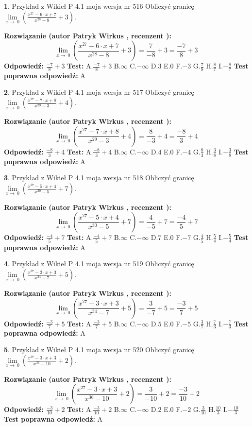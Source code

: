 \documentclass[12pt, a4paper]{article}
\theoremstyle{definition} %
\newtheorem{zad}{}
\newcommand{\zadStart}[1]{\begin{zad}#1\newline}
\newcommand{\zadStop}{\end{zad}}
\newcommand{\rozwStart}[2]{\noindent \textbf{Rozwiązanie (autor #1 , recenzent #2): }\newline}
\newcommand{\rozwStop}{\newline}
\newcommand{\odpStart}{\noindent \textbf{Odpowiedź:}\newline}
\newcommand{\odpStop}{\newline}
\newcommand{\testStart}{\noindent \textbf{Test:}\newline}
\newcommand{\testStop}{\newline}
\newcommand{\kluczStart}{\noindent \textbf{Test poprawna odpowiedź:}\newline}
\newcommand{\kluczStop}{\newline}
\begin{document}
\zadStart{Przykład z Wikieł P 4.1 moja wersja nr 516}
Obliczyć granicę $\lim\limits_{x\to\ 0}(\frac{x^{27}-6 \cdot x +7}{x^{28}-8}+3)$.
\zadStop
\rozwStart{Patryk Wirkus}{}
$$\lim\limits_{x\to\ 0}(\frac{x^{27}-6 \cdot x +7}{x^{28}-8}+3)=\frac{7}{-8}+3=\frac{-7}{8}+3$$
\rozwStop
\odpStart
$\frac{-7}{8}+3$
\odpStop
\testStart
A.$\frac{-7}{8}+3$
B.$\infty$
C.$-\infty$
D.$3$
E.$0$
F.$-3$
G.$\frac{7}{8}$
H.$\frac{8}{7}$
I.$-\frac{8}{7}$
\testStop
\kluczStart
A
\kluczStop



\zadStart{Przykład z Wikieł P 4.1 moja wersja nr 517}
Obliczyć granicę $\lim\limits_{x\to\ 0}(\frac{x^{27}-7 \cdot x +8}{x^{29}-3}+4)$.
\zadStop
\rozwStart{Patryk Wirkus}{}
$$\lim\limits_{x\to\ 0}(\frac{x^{27}-7 \cdot x +8}{x^{29}-3}+4)=\frac{8}{-3}+4=\frac{-8}{3}+4$$
\rozwStop
\odpStart
$\frac{-8}{3}+4$
\odpStop
\testStart
A.$\frac{-8}{3}+4$
B.$\infty$
C.$-\infty$
D.$4$
E.$0$
F.$-4$
G.$\frac{8}{3}$
H.$\frac{3}{8}$
I.$-\frac{3}{8}$
\testStop
\kluczStart
A
\kluczStop



\zadStart{Przykład z Wikieł P 4.1 moja wersja nr 518}
Obliczyć granicę $\lim\limits_{x\to\ 0}(\frac{x^{27}-5 \cdot x +4}{x^{30}-5}+7)$.
\zadStop
\rozwStart{Patryk Wirkus}{}
$$\lim\limits_{x\to\ 0}(\frac{x^{27}-5 \cdot x +4}{x^{30}-5}+7)=\frac{4}{-5}+7=\frac{-4}{5}+7$$
\rozwStop
\odpStart
$\frac{-4}{5}+7$
\odpStop
\testStart
A.$\frac{-4}{5}+7$
B.$\infty$
C.$-\infty$
D.$7$
E.$0$
F.$-7$
G.$\frac{4}{5}$
H.$\frac{5}{4}$
I.$-\frac{5}{4}$
\testStop
\kluczStart
A
\kluczStop



\zadStart{Przykład z Wikieł P 4.1 moja wersja nr 519}
Obliczyć granicę $\lim\limits_{x\to\ 0}(\frac{x^{27}-3 \cdot x +3}{x^{34}-7}+5)$.
\zadStop
\rozwStart{Patryk Wirkus}{}
$$\lim\limits_{x\to\ 0}(\frac{x^{27}-3 \cdot x +3}{x^{34}-7}+5)=\frac{3}{-7}+5=\frac{-3}{7}+5$$
\rozwStop
\odpStart
$\frac{-3}{7}+5$
\odpStop
\testStart
A.$\frac{-3}{7}+5$
B.$\infty$
C.$-\infty$
D.$5$
E.$0$
F.$-5$
G.$\frac{3}{7}$
H.$\frac{7}{3}$
I.$-\frac{7}{3}$
\testStop
\kluczStart
A
\kluczStop



\zadStart{Przykład z Wikieł P 4.1 moja wersja nr 520}
Obliczyć granicę $\lim\limits_{x\to\ 0}(\frac{x^{27}-3 \cdot x +3}{x^{36}-10}+2)$.
\zadStop
\rozwStart{Patryk Wirkus}{}
$$\lim\limits_{x\to\ 0}(\frac{x^{27}-3 \cdot x +3}{x^{36}-10}+2)=\frac{3}{-10}+2=\frac{-3}{10}+2$$
\rozwStop
\odpStart
$\frac{-3}{10}+2$
\odpStop
\testStart
A.$\frac{-3}{10}+2$
B.$\infty$
C.$-\infty$
D.$2$
E.$0$
F.$-2$
G.$\frac{3}{10}$
H.$\frac{10}{3}$
I.$-\frac{10}{3}$
\testStop
\kluczStart
A
\kluczStop
\end{document}
